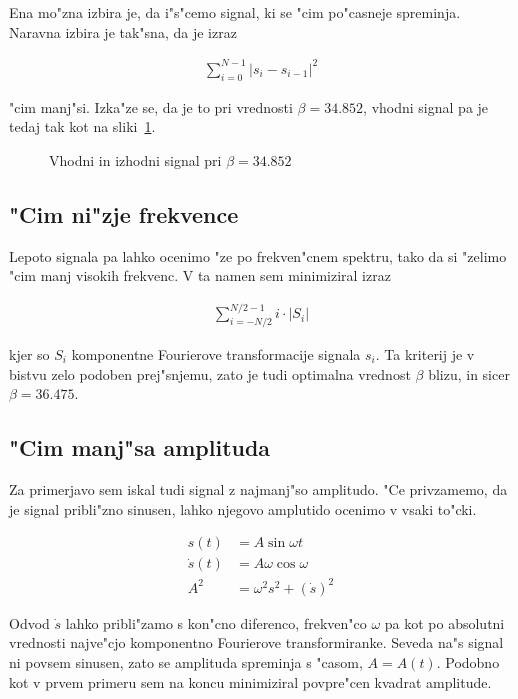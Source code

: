 \documentclass[a4paper,10pt]{article}
\begin{document}
Ena mo"zna izbira je, da i"s"cemo signal, ki se "cim po"casneje spreminja. Naravna izbira je tak"sna, da je izraz

\begin{align}
  \sum_{i=0}^{N-1} \left| s_i - s_{i-1}\right|^2
\end{align}

"cim manj"si. Izka"ze se, da je to pri vrednosti $\beta = 34.852$, vhodni signal pa je tedaj tak kot na sliki~\ref{fig:dekon-signal}. 

\begin{figure}[h]
 
\caption{Vhodni in izhodni signal pri $\beta = 34.852$}
\label{fig:dekon-signal}
\end{figure}

\subsection{"Cim ni"zje frekvence}

Lepoto signala pa lahko ocenimo "ze po frekven"cnem spektru, tako da si "zelimo "cim manj visokih frekvenc. V ta namen sem minimiziral izraz

\begin{align}
 \sum_{i=-N/2}^{N/2-1} i\cdot|S_i|
\end{align}

kjer so $S_i$ komponentne Fourierove transformacije signala $s_i$. Ta kriterij je v bistvu zelo podoben prej"snjemu, zato je tudi optimalna vrednost $\beta$ blizu, in sicer $\beta = 36.475$. 

\subsection{"Cim manj"sa amplituda}

Za primerjavo sem iskal tudi signal z najmanj"so amplitudo. "Ce privzamemo, da je signal pribli"zno sinusen, lahko njegovo amplutido ocenimo v vsaki to"cki. 

\begin{align}
 s(t) &= A\sin \omega t \\
 \dot s(t) &= A\omega \cos \omega \\ 
 A^2 &= \omega^2 s^2 + (\dot{s})^2
\end{align}

Odvod $\dot s$ lahko pribli"zamo s kon"cno diferenco, frekven"co $\omega$ pa kot po absolutni vrednosti najve"cjo komponentno Fourierove transformiranke. Seveda na"s signal ni povsem sinusen, zato se amplituda spreminja s "casom, $A = A(t)$. Podobno kot v prvem primeru sem na koncu minimiziral povpre"cen kvadrat amplitude. 
\end{document}
